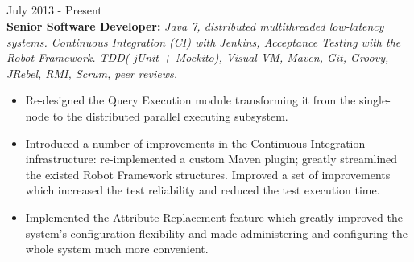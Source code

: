 \documentclass{res}
\newcommand{\osection}[1]{\section{\sc {\Large \textbf{#1}\\}} \vspace{0.30cm}}
\begin{document}
\begin{resume}
\osection{Career History}
 \hfill        July 2013 - Present \\
{\bf Senior Software Developer:} {\em Java 7, distributed multithreaded low-latency systems. Continuous Integration (CI) with Jenkins, Acceptance Testing with the Robot Framework. TDD( jUnit + Mockito), Visual VM, Maven, Git, Groovy, JRebel, RMI, Scrum, peer reviews.}
\begin{itemize}
 \item Re-designed the Query Execution module transforming it from the single-node to the distributed parallel executing subsystem.
 \item Introduced a number of improvements in the Continuous Integration infrastructure: re-implemented a custom Maven plugin; greatly streamlined the existed Robot Framework structures. Improved a set of improvements which increased the test reliability and reduced the test execution time.
 \item Implemented the Attribute Replacement feature which greatly improved the system’s configuration flexibility and made administering and configuring the whole system much more convenient.
 \end{itemize}


\end{resume}
\end{document}
